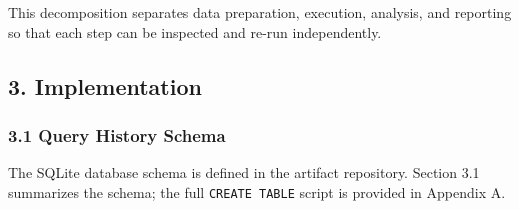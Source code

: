 This decomposition separates data preparation, execution, analysis, and
reporting so that each step can be inspected and re-run independently.

\subsection{3. Implementation}\label{implementation}

\subsubsection{3.1 Query History Schema}\label{query-history-schema}

The SQLite database schema is defined in the artifact repository.
Section 3.1 summarizes the schema; the full \texttt{CREATE\ TABLE}
script is provided in Appendix A.

